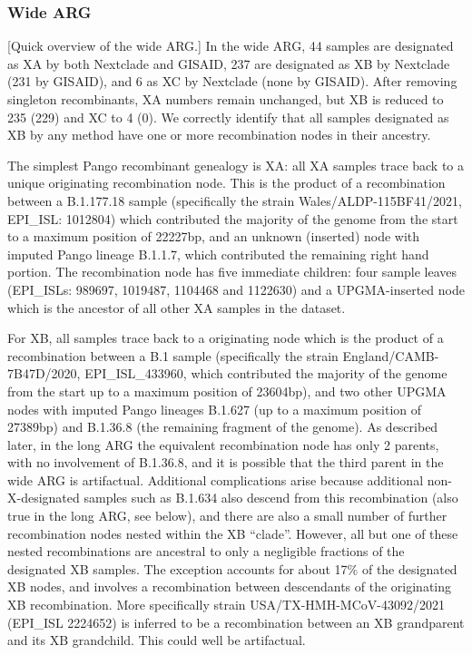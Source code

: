 \documentclass{article}
\begin{document}
\subsubsection{Wide ARG}
[Quick overview of the wide ARG.]
In the wide ARG, 44
samples are designated as XA by both Nextclade and GISAID, 237 are designated
as XB by Nextclade (231 by GISAID), and 6 as XC by Nextclade (none by GISAID).
After removing singleton recombinants, XA numbers remain unchanged, but XB is
reduced to 235 (229) and XC to 4 (0). We correctly identify that all samples
designated as XB by any method have one or more recombination nodes in their
ancestry.

The simplest Pango recombinant genealogy is XA: all XA samples trace back to a
unique originating recombination node. This is the product of a recombination
between a B.1.177.18 sample (specifically the strain Wales/ALDP-115BF41/2021,
EPI\_ISL: 1012804) which contributed the majority of the genome from the start
to a maximum position of 22227bp, and an unknown (inserted) node with imputed
Pango lineage B.1.1.7, which contributed the remaining right hand portion. The
recombination node has five immediate children: four sample leaves (EPI\_ISLs:
989697, 1019487, 1104468 and 1122630) and a UPGMA-inserted node which is the
ancestor of all other XA samples in the dataset.

For XB, all samples trace back to a originating node which is the product of a
recombination between a B.1 sample (specifically the strain
England/CAMB-7B47D/2020, EPI\_ISL\_433960, which contributed the majority of
the genome from the start up to a maximum position of 23604bp), and two other
UPGMA nodes with imputed Pango lineages B.1.627 (up to a maximum position of
27389bp) and B.1.36.8 (the remaining fragment of the genome). As described
later, in the long ARG the equivalent recombination node has only 2 parents,
with no involvement of  B.1.36.8, and it is possible that the third parent in
the wide ARG is artifactual. Additional complications arise because additional
non-X-designated samples such as B.1.634 also descend from this recombination
(also true in the long ARG, see below), and there are also a small number of
further recombination nodes nested within the XB ``clade''. However, all but
one of these nested recombinations are ancestral to only a negligible fractions
of the designated XB samples. The exception accounts for about 17\% of the
designated XB nodes, and involves a recombination between descendants of the
originating XB recombination. More specifically strain
USA/TX-HMH-MCoV-43092/2021 (EPI\_ISL 2224652) is inferred to be a recombination
between an XB grandparent and its XB grandchild. This could well be
artifactual.
\end{document}
